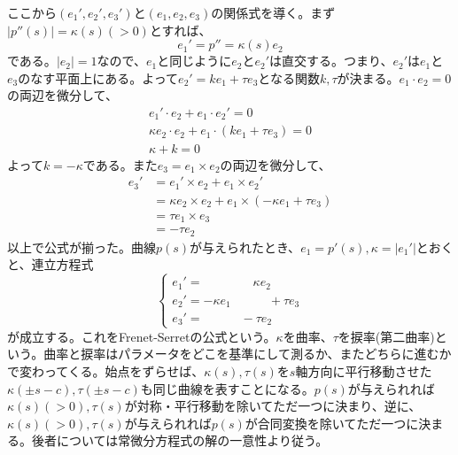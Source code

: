        ここから$(e_1',e_2',e_3')$と$(e_1,e_2,e_3)$の関係式を導く。まず$|p''(s)| = \kappa(s)(>0)$とすれば、
            \[e_1' = p'' = \kappa(s) e_2\]
        である。$|e_2| = 1$なので、$e_1$と同じように$e_2$と$e_2'$は直交する。つまり、$e_2'$は$e_1$と$e_3$のなす平面上にある。よって$e_2' = ke_1 + \tau e_3$となる関数$k,\tau$が決まる。$e_1\cdot e_2 = 0$の両辺を微分して、
        \begin{align*}
            e_1'\cdot e_2 + e_1\cdot e_2' = 0\\
            \kappa e_2\cdot e_2 + e_1\cdot (ke_1 + \tau e_3) = 0\\
            \kappa + k = 0
        \end{align*}
        よって$k = -\kappa$である。また$e_3 = e_1\times e_2$の両辺を微分して、
        \begin{align*}
            e_3'
            &= e_1'\times e_2+e_1\times e_2'\\
            &= \kappa e_2\times e_2+e_1\times (-\kappa e_1+\tau e_3)\\
            &= \tau e_1\times e_3\\
            &= -\tau e_2
        \end{align*}
        以上で公式が揃った。曲線$p(s)$が与えられたとき、$e_1 = p'(s),\kappa = |e_1'|$とおくと、連立方程式
            \[
                \begin{cases}
                    e_1' = \qquad\qquad \kappa e_2\\
                    e_2' = -\kappa e_1\quad\qquad +\tau e_3\\
                    e_3' = \quad\qquad -\tau e_2
                \end{cases}
            \]
        が成立する。これをFrenet-Serretの公式という。$\kappa$を曲率、$\tau$を捩率(第二曲率)という。曲率と捩率はパラメータをどこを基準にして測るか、またどちらに進むかで変わってくる。始点をずらせば、$\kappa(s),\tau(s)$を$s$軸方向に平行移動させた$\kappa(\pm s-c),\tau(\pm s-c)$も同じ曲線を表すことになる。$p(s)$が与えられれば$\kappa(s)(>0),\tau(s)$が対称・平行移動を除いてただ一つに決まり、逆に、$\kappa(s)(>0),\tau(s)$が与えられれば$p(s)$が合同変換を除いてただ一つに決まる。後者については常微分方程式の解の一意性より従う。